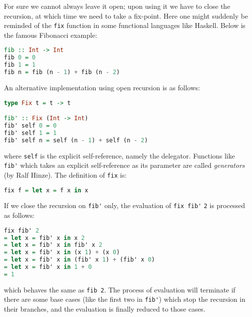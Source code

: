 For sure we cannot always leave it open; upon using it we have to close the recursion, at which time we need to take a fix-point. Here one might suddenly be reminded of the \lstinline{fix} function in some functional languages like Haskell. Below is the famous Fibonacci example:
\begin{lstlisting}[language=Haskell,keywords={}]
fib :: Int -> Int
fib 0 = 0
fib 1 = 1
fib n = fib (n - 1) + fib (n - 2)
\end{lstlisting}
An alternative implementation using open recursion is as follows:
\begin{lstlisting}[language=Haskell,keywords={type}]
type Fix t = t -> t

fib' :: Fix (Int -> Int)
fib' self 0 = 0
fib' self 1 = 1
fib' self n = self (n - 1) + self (n - 2)
\end{lstlisting}
where \lstinline{self} is the explicit self-reference, namely the delegator. Functions like \lstinline{fib'} which takes
an explicit self-reference as its parameter are called \textit{generators} (by Ralf Hinze). The definition of \lstinline{fix} is:
\begin{lstlisting}[language=Haskell,keywords={}]
fix f = let x = f x in x
\end{lstlisting}
If we close the recursion on \lstinline{fib'} only, the evaluation of \lstinline{fix fib'} \lstinline{2} is processed as follows:
\begin{lstlisting}[language=Haskell,keywords={}]
   fix fib' 2
= let x = fib' x in x 2
= let x = fib' x in fib' x 2
= let x = fib' x in (x 1) + (x 0)
= let x = fib' x in (fib' x 1) + (fib' x 0)
= let x = fib' x in 1 + 0
= 1
\end{lstlisting}
which behaves the same as \lstinline{fib 2}. The process of evaluation will terminate if there are some base cases (like the first two in
\lstinline{fib'}) which stop the recursion in their branches, and the evaluation is finally reduced to those cases.

